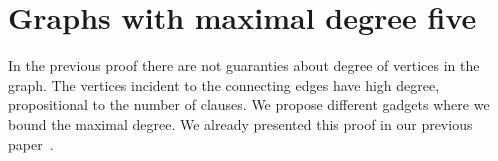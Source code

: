 \section{Graphs with maximal degree five}

In the previous proof there are not guaranties about
degree of vertices in the graph. The vertices incident to the connecting edges
have high degree, propositional to the number of clauses.
We propose different gadgets where we bound the maximal degree.
We already presented this proof in our previous paper~\cite{my_paper}.

%
%

